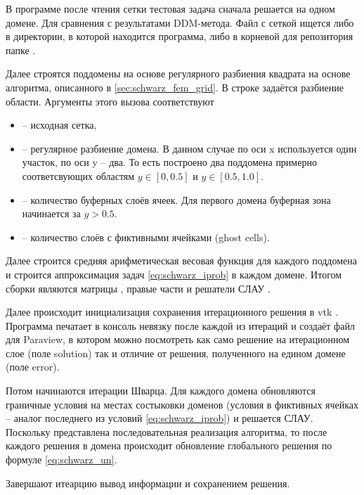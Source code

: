 В программе после чтения сетки тестовая задача сначала решается на одном домене. Для
сравнения с результатами DDM-метода.
Файл с сеткой ищется либо в директории, в которой находится программа, либо в корневой для репозитория папке .

Далее строятся поддомены на основе регулярного разбиения квадрата на основе алгоритма, описанного в \ref{sec:schwarz_fem_grid}.
В строке
задаётся разбиение области.
Аргументы этого вызова соответствуют
\begin{itemize}
\item {} -- исходная сетка,
\item {} -- регулярное разбиение домена. В данном случае по оси x используется один участок, по оси y -- два.
То есть построено два поддомена примерно соответсвующих областям $y\in[0, 0.5]$  и $y\in[0.5, 1.0]$.
\item {} -- количество буферных слоёв ячеек. Для первого домена буферная зона начинается за $y>0.5$.
\item {} -- количество слоёв с фиктивными ячейками (ghost cells).
\end{itemize}

Далее строится средняя арифметическая весовая функция для каждого поддомена  
и строится аппроксимация задач \cref{eq:schwarz_iprob} в каждом домене.
Итогом сборки являются матрицы , правые части 
и решатели СЛАУ .

Далее происходит инициализация сохранения итерационного решения в vtk .
Программа печатает в консоль невязку после каждой из итераций и создаёт файл 
для Paraview, в котором можно посмотреть как само решение на итерационном слое (поле solution) так и отличие от решения, полученного на едином домене (поле error).

Потом начинаются итерации Шварца.
Для каждого домена обновляются граничные условия на местах состыковки доменов (условия в фиктивных ячейках -- аналог последнего из условий \cref{eq:schwarz_iprob})
и решается СЛАУ.
Поскольку представлена последовательная реализация алгоритма, то после каждого решения в домена
происходит обновление глобального решения по формуле \cref{eq:schwarz_un}.

Завершают итеарцию вывод информации и сохранением решения.


